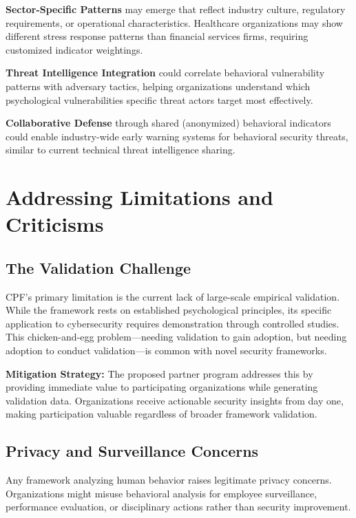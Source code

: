 \documentclass[11pt,a4paper]{article}
\begin{document}
\textbf{Sector-Specific Patterns} may emerge that reflect industry culture, regulatory requirements, or operational characteristics. Healthcare organizations may show different stress response patterns than financial services firms, requiring customized indicator weightings.

\textbf{Threat Intelligence Integration} could correlate behavioral vulnerability patterns with adversary tactics, helping organizations understand which psychological vulnerabilities specific threat actors target most effectively.

\textbf{Collaborative Defense} through shared (anonymized) behavioral indicators could enable industry-wide early warning systems for behavioral security threats, similar to current technical threat intelligence sharing.

\section{Addressing Limitations and Criticisms}

\subsection{The Validation Challenge}

CPF's primary limitation is the current lack of large-scale empirical validation. While the framework rests on established psychological principles, its specific application to cybersecurity requires demonstration through controlled studies. This chicken-and-egg problem—needing validation to gain adoption, but needing adoption to conduct validation—is common with novel security frameworks.

\textbf{Mitigation Strategy:} The proposed partner program addresses this by providing immediate value to participating organizations while generating validation data. Organizations receive actionable security insights from day one, making participation valuable regardless of broader framework validation.

\subsection{Privacy and Surveillance Concerns}

Any framework analyzing human behavior raises legitimate privacy concerns. Organizations might misuse behavioral analysis for employee surveillance, performance evaluation, or disciplinary actions rather than security improvement.
\end{document}
